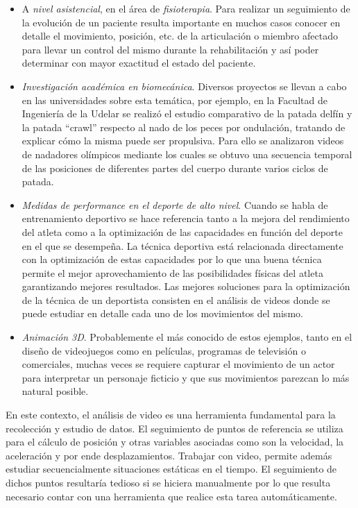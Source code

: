 \begin{itemize}
\item A \emph{nivel asistencial}, en el área de \emph{fisioterapia}. Para realizar un seguimiento de la evolución de un paciente resulta importante en muchos casos conocer en detalle el movimiento, posición, etc. de la articulación o miembro afectado para llevar un control del mismo durante la rehabilitación y así poder determinar con mayor exactitud el estado del paciente.
\item \emph{Investigación académica en biomecánica}. Diversos proyectos se llevan a cabo en las universidades sobre esta temática, por ejemplo, en la Facultad de Ingeniería de la Udelar  se realizó el estudio comparativo de la patada delfín y la patada “crawl” respecto al nado de los peces por ondulación, tratando de explicar cómo la misma puede ser propulsiva. Para ello se analizaron videos de nadadores olímpicos mediante los cuales se obtuvo una secuencia temporal de las posiciones de diferentes partes del cuerpo durante varios ciclos de patada.
\item \emph{Medidas de performance en el deporte de alto nivel}. Cuando se habla de entrenamiento deportivo se hace referencia tanto a la mejora del rendimiento del atleta como a la optimización de las capacidades en función del deporte en el que se desempeña. La técnica deportiva está relacionada directamente con la optimización de estas capacidades por lo que una buena técnica permite el mejor aprovechamiento de las posibilidades físicas del atleta garantizando mejores resultados. Las mejores soluciones para la optimización de la técnica de un deportista consisten en el análisis de videos donde se puede estudiar en detalle cada uno de los movimientos del  mismo.
\item \emph{Animación 3D}. Probablemente el más conocido de estos ejemplos, tanto en el diseño de videojuegos como en películas, programas de televisión o comerciales, muchas veces se requiere capturar el movimiento de un actor para interpretar un personaje ficticio y que sus movimientos parezcan lo más natural posible.
\end{itemize}

En este contexto, el análisis de video  es  una  herramienta  fundamental para la recolección y estudio de datos. El seguimiento de puntos de referencia se utiliza para el cálculo de posición y otras variables asociadas como son la velocidad, la aceleración y por ende desplazamientos. Trabajar con video, permite además estudiar secuencialmente situaciones estáticas en el tiempo. El seguimiento de dichos puntos resultaría tedioso si se hiciera manualmente por lo que resulta necesario contar con una herramienta que realice esta tarea automáticamente.
\\ 

